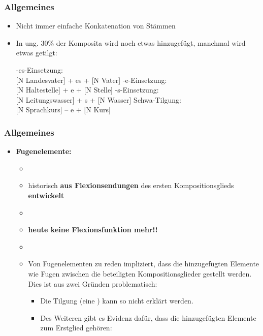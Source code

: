 \begin{frame}
\frametitle{Allgemeines}

\begin{itemize}
	\item Nicht immer einfache Konkatenation von Stämmen
	\item In ung. 30\% der Komposita wird noch etwas hinzugefügt, manchmal wird etwas getilgt:
	
	\eal 
		\ex -es-Einsetzung: \\
		 {[N Landesvater] \ras [N Land] + es + [N Vater]}
		\ex -e-Einsetzung: \\
		 {[N Haltestelle] \ras [V halt] + e + [N Stelle]}
		\ex -s-Einsetzung: \\
		 {[N Leitungswasser] \ras [N Leitung] + s + [N Wasser]}
		\ex Schwa-Tilgung: \\
		 {[N Sprachkurs] \ras [N Sprache] – e + [N Kurs]}
	\zl
		 
\end{itemize}


\end{frame}


\begin{frame}
\frametitle{Allgemeines}

\begin{itemize}
	\item \textbf{Fugenelemente:}
	
	\begin{itemize}
		\item[]
		\item historisch \textbf{aus Flexionsendungen} des ersten Kompositionsglieds \textbf{entwickelt}
		\item[]
		\item \textbf{heute keine Flexionsfunktion mehr!!}
		\item[]
		\item Von Fugenelementen zu reden impliziert, dass die hinzugefügten Elemente wie Fugen zwischen die beteiligten Kompositionsglieder gestellt werden. Dies ist aus zwei Gründen problematisch:
		
		\begin{itemize}
			\item Die Tilgung (eine ) kann so nicht erklärt werden.
			\item Des Weiteren gibt es Evidenz dafür, dass die hinzugefügten Elemente zum Erstglied gehören:
		\end{itemize}
	\end{itemize}
\end{itemize}


\end{frame}


